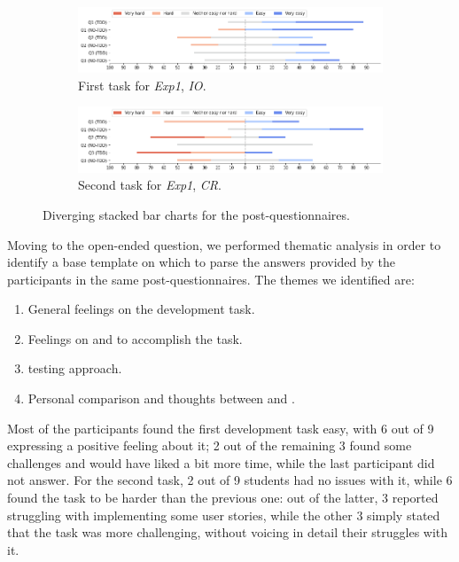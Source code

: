 \begin{figure}[htbp]
    \begin{subfigure}{\textwidth}
        \includegraphics[width=\textwidth]{figures/bar_charts/task1.png}
        \caption{First task for \textit{Exp1}, \textit{IO}.}
    \end{subfigure}
    
    \bigskip
    
    \begin{subfigure}{\textwidth}
        \includegraphics[width=\textwidth]{figures/bar_charts/task2.png}
        \caption{Second task for \textit{Exp1}, \textit{CR}.}
    \end{subfigure}
    
    \caption{Diverging stacked bar charts for the post-questionnaires.}
    \label{bar_charts}
\end{figure}

Moving to the open-ended question, we performed thematic analysis in order to identify a base template on which to parse the answers provided by the participants in the same post-questionnaires.
The themes we identified are:

\begin{enumerate}
    \item General feelings on the development task.
    \item Feelings on \tdd and \notdd to accomplish the task.
    \item \notdd testing approach.
    \item Personal comparison and thoughts between \tdd and \notdd.
\end{enumerate}

Most of the participants found the first development task easy, with 6 out of 9 expressing a positive feeling about it; 2 out of the remaining 3 found some challenges and would have liked a bit more time, while the last participant did not answer. 
For the second task, 2 out of 9 students had no issues with it, while 6 found the task to be harder than the previous one: out of the latter, 3 reported struggling with implementing some user stories, while the other 3 simply stated that the task was more challenging, without voicing in detail their struggles with it.

